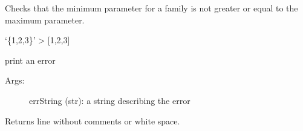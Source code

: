 \documentclass[letterpaper,10pt,english]{sphinxmanual}
\begin{document}
\begin{fulllineitems}
\begin{fulllineitems}
\end{fulllineitems}


\begin{fulllineitems}
\label{\detokenize{pydfnworks:pydfnworks.helper.input_helper.check_min_max}}
Checks that the minimum parameter for a family is not greater or equal to the maximum parameter.

\end{fulllineitems}


\begin{fulllineitems}
\label{\detokenize{pydfnworks:pydfnworks.helper.input_helper.curly_to_list}}
‘\{1,2,3\}’ \textendash{}\textgreater{} {[}1,2,3{]}

\end{fulllineitems}


\begin{fulllineitems}
\label{\detokenize{pydfnworks:pydfnworks.helper.input_helper.error}}
print an error
\begin{description}
\item[{Args:}] \leavevmode
errString (str): a string describing the error

\end{description}

\end{fulllineitems}


\begin{fulllineitems}
\label{\detokenize{pydfnworks:pydfnworks.helper.input_helper.extract_parameters}}
Returns line without comments or white space.

\end{fulllineitems}



\end{fulllineitems}
\end{document}
